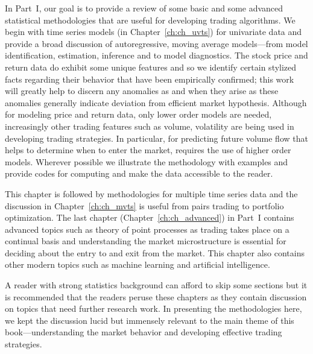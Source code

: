 
In Part~I, our goal is to provide a review of some basic and some advanced statistical methodologies that are useful for developing trading algorithms. We begin with time series models (in Chapter~\ref{ch:ch_uvts}) for univariate data and provide a broad discussion of autoregressive, moving average models---from model identification, estimation, inference and to model diagnostics. The stock price and return data do exhibit some unique features and so we identify certain stylized facts regarding their behavior that have been empirically confirmed; this work will greatly help to discern any anomalies as and when they arise as these anomalies generally indicate deviation from efficient market hypothesis. Although for modeling price and return data, only lower order models are needed, increasingly other trading features such as volume, volatility are being used in developing trading strategies. In particular, for predicting future volume flow that helps to determine when to enter the market, requires the use of higher order models. Wherever possible we illustrate the methodology with examples and provide codes for computing and make the data accessible to the reader. 


This chapter is followed by methodologies for multiple time series data and the discussion in Chapter~\ref{ch:ch_mvts} is useful from pairs trading to portfolio optimization. The last chapter (Chapter~\ref{ch:ch_advanced}) in Part~I contains advanced topics such as theory of point processes as trading takes place on a continual basis and understanding the market microstructure is essential for deciding about the entry to and exit from the market. This chapter also contains other modern topics such as machine learning and artificial intelligence. 


A reader with strong statistics background can afford to skip some sections but it is recommended that the readers peruse these chapters as they contain discussion on topics that need further research work. In presenting the methodologies here, we kept the discussion lucid but immensely relevant to the main theme of this book---understanding the market behavior and developing effective trading strategies. 